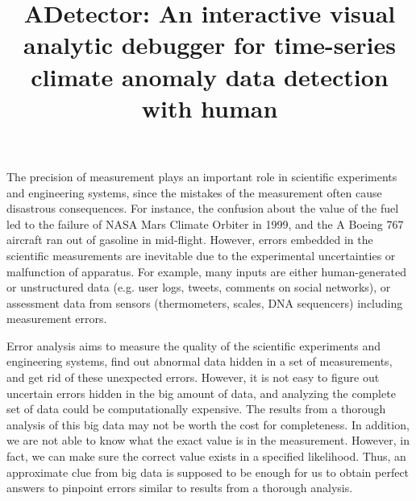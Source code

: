 \documentclass{vgtc}                          %
\title{ADetector: An interactive visual analytic debugger for time-series climate anomaly data detection with human}
\author{Tsung Tai Yeh\thanks{e-mail: yeh14@purdue.edu}\\ %
     \parbox{1.4in} \scriptsize Electrical Computer Engineering Department \\ Purdue University %
\and Shuying Feng\thanks{e-mail:feng98@purdue.edu}\\ %
     \parbox{1.4in}\scriptsize Electrical Computer Engineering Department \\ Purdue University %
}
\begin{document}


\maketitle


	The precision of measurement plays an important role in scientific experiments and engineering systems, since the mistakes of the measurement often cause disastrous consequences. For instance, the confusion about the value of the fuel led to the failure of NASA Mars Climate Orbiter in 1999, and the A Boeing 767 aircraft ran out of gasoline in mid-flight\cite{ifan2012}. However, errors embedded in the scientific measurements are inevitable due to the experimental uncertainties or malfunction of apparatus. For example,  many inputs are either human-generated or unstructured data (e.g. user logs, tweets, comments on social networks), or assessment data from sensors (thermometers, scales, DNA sequencers) including measurement errors. 

	Error analysis aims to measure the quality of the scientific experiments and engineering systems, find out abnormal data hidden in a set of measurements, and get rid of these unexpected errors. However, it is not easy to figure out uncertain errors hidden in the big amount of data, and analyzing the complete set of data could be computationally expensive. The results from a thorough analysis of this big data may not be worth the cost for completeness. In addition, we are not able to know what the exact value is in the measurement. However, in fact, we can make sure the correct value exists in a specified likelihood\cite{ifan2012}. Thus, an approximate clue from big data is supposed to be enough for us to obtain perfect answers to pinpoint errors similar to results from a thorough analysis.
	
\end{document}
